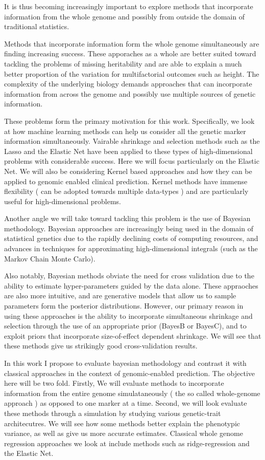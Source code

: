 \documentclass{sig-alternate-05-2015}
\begin{document}
It is thus becoming increasingly important to explore methods that incorporate information from
the whole genome and possibly from outside the domain of traditional statistics.

Methods that incorporate information form the whole genome simultaneously are finding increasing success.
These apporaches as a whole are better suited toward tackling the problems of missing heritability and are able to explain a much better
proportion of the variation for multifactorial outcomes such as height.\cite{eichler_missing_2010}
The complexity of the underlying biology demands approaches that can incorporate information from across the genome and possibly use multiple sources of genetic information.

These problems form the primary motivation for this work. Specifically, we look at how machine learning methods can help us consider all the genetic marker information simultaneously.
Vairable shrinkage and selection methods such as the Lasso and the Elastic Net have been applied to these types of high-dimensional problems with considerable success.\cite{waldmann_evaluation_2013} Here we will focus particularly on the
Elastic Net. We will also be considering Kernel based approaches and how they can be applied to genomic enabled clinical prediction.
Kernel methods have immense flexibility ( can be adopted towards multiple data-types ) and are particularly useful for high-dimensional problems.\cite{wang_kernel_2015}

Another angle we will take toward tackling this problem is the use of Bayesian methodology. Bayesian approaches are increasingly being used in the domain
of statistical genetics due to the rapidly declining costs of computing resources, and advances in
techniques for approximating high-dimensional integrals (such as the Markov Chain Monte Carlo).

Also notably, Bayesian methods obviate the need for cross validation due to the ability to estimate hyper-parameters guided by the data alone.
These appraoches are also more intuitive, and are generative models that allow us to sample parameters
form the posterior distributions. However, our primary reason in using these approaches is the ability to incorporate simultaneous shrinkage and selection through the
use of an appropriate prior (BayesB or BayesC), and to exploit priors that incorporate size-of-effect dependent shrinkage. We will see that these methods give us
strikingly good cross-validation results.

In this work I propose to evaluate bayesian methodology and contrast it with classical approaches in the context of genomic-enabled prediction. The objective here will be two fold.
Firstly, We will evaluate methods to incorporate information from the entire genome simulataneously ( the so called whole-genome approach ) as opposed to one marker at a time.
Second, we will look evaluate these methods through a simulation by studying various genetic-trait architecutres.
We will see how some methods better explain the phenotypic variance, as well as give us more accurate estimates. Classical whole genome regression
approaches we look at include methods such as ridge-regression and the Elastic Net.\cite{waldmann_evaluation_2013}
\end{document}
